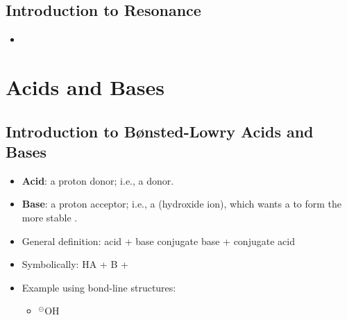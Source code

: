 \documentclass[12pt,a4paper]{article}
\begin{document}
\subsection{Introduction to Resonance}
\begin{itemize}
    \item 
\end{itemize}

\clearpage
\section{Acids and Bases}
\subsection{Introduction to B{\o}nsted-Lowry Acids and Bases}
\begin{itemize}
    \item \textbf{Acid}: a {\color{o-Sun}proton donor}; i.e., a {\color{pos}} donor.
    \item \textbf{Base}: a {\color{o-Sun}proton acceptor}; i.e., a {\color{neg}} (hydroxide ion), which wants a {\color{pos}} to form the more stable .
    \item General definition: {\color{pos}acid} + {\color{neg}base} \ch{<>} {\color{neg}conjugate base} + {\color{pos}conjugate acid}
    \item Symbolically: {\color{pos}HA} + {\color{neg}B} \ch{<>} {\color{neg}} + {\color{pos}}
    \item Example using bond-line structures:
        \begin{itemize}
            \item 
            \hspace{6pt}{\large+}\hspace{6pt}
            \hspace{6pt}{\large\ch{<>}}\hspace{6pt}
            {\color{neg}$^\circleddash$O}H
            \hspace{6pt}{\large+}\hspace{6pt}
    \end{itemize}
\end{itemize}
\end{document}
